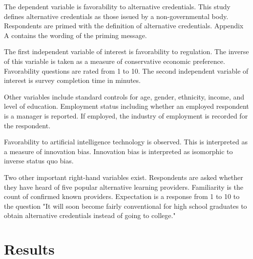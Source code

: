 \documentclass[review]{elsarticle}
\begin{document}
The dependent variable is favorability to alternative credentials.
This study defines alternative credentials as those issued by a non-governmental body.
Respondents are primed with the definition of alternative credentials.
Appendix A contains the wording of the priming message.

The first independent variable of interest is favorability to regulation.
The inverse of this variable is taken as a measure of conservative economic preference.
Favorability questions are rated from 1 to 10.
The second independent variable of interest is survey completion time in minutes.

Other variables include standard controls for age,
gender, ethnicity, income, and level of education.
Employment status including whether an employed respondent is a manager is reported.
If employed, the industry of employment is recorded for the respondent.

Favorability to artificial intelligence technology is observed.
This is interpreted as a measure of innovation bias.
Innovation bias is interpreted as isomorphic to inverse status quo bias.

Two other important right-hand variables exist.
Respondents are asked whether they have heard of five popular alternative learning providers.
Familiarity is the count of confirmed known providers.
Expectation is a response from 1 to 10 to the question
"It will soon become fairly conventional for high school graduates to obtain alternative credentials instead of going to college."

%

\section{Results}
\end{document}
